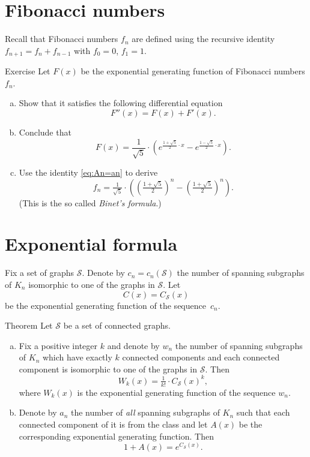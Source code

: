 \section*{Fibonacci numbers}

Recall that Fibonacci numbers $f_n$ are defined using the recursive identity 
$f_{n+1}=f_n+f_{n-1}$
with $f_0=0$, $f_1=1$.

\begin{thm}{Exercise}
Let $F(x)$ be the exponential generating function of Fibonacci numbers $f_n$.
\begin{enumerate}[(a)]
\item Show that it satisfies the following differential equation
\[F''(x)=F(x)+F'(x).\]
\item Conclude that 
\[F(x)=\frac{1}{\sqrt5}\cdot\left(e^{\frac{1+\sqrt{5}}{2}\cdot x}- e^{\frac{1-\sqrt{5}}{2}\cdot x}\right).\]
\item Use the identity \ref{eq:An=an} to derive 
\[f_n=\tfrac{1}{\sqrt5}\cdot\left((\tfrac{1+\sqrt{5}}{2})^n-(\tfrac{1+\sqrt{5}}{2})^n\right).\]
(This is the so called \emph{Binet's formula}.) 
\end{enumerate}

\end{thm}


\section*{Exponential formula}

Fix a set of graphs $\mathcal{S}$.
Denote by $c_n=c_n(\mathcal{S})$ the number of spanning subgraphs of $K_n$ isomorphic to one of the graphs in $\mathcal{S}$. 
Let \[C(x)=C_{\mathcal{S}}(x)\] be the exponential generating function of the sequence~$c_n$. 


\begin{thm}{Theorem}\label{thm:exp-formula}
Let $\mathcal{S}$ be a set of connected graphs. 

\begin{enumerate}[(a)]
\item\label{thm:exp-formula:Wk} Fix a positive integer $k$ and denote by $w_n$ the number of spanning subgraphs of $K_n$ which have exactly $k$ connected components and each connected component is  isomorphic to one of the graphs in $\mathcal{S}$.
Then
\[W_k(x)=\tfrac1{k!}\cdot C_{\mathcal{S}}(x)^k,\]
where $W_k(x)$ is the exponential generating function of the sequence $w_n$.

\item\label{thm:exp-formula:all} Denote by $a_n$ the number of {}\emph{all} spanning subgraphs of $K_n$ such that each connected component of it is from the class and let $A(x)$ be the corresponding exponential generating function.
Then
\[1+A(x)=e^{C_{\mathcal{S}}(x)}.\]
\end{enumerate}

\end{thm}

